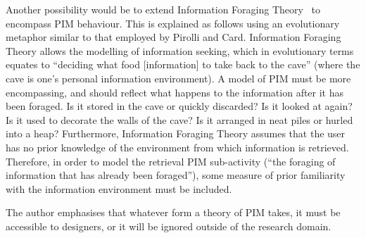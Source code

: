 Another possibility would be to extend Information Foraging Theory~\citep{pirolli:99} to encompass PIM behaviour.  This is explained as follows using an evolutionary metaphor similar to that employed by Pirolli and Card.  Information Foraging Theory allows the modelling of information seeking, which in evolutionary terms equates to ``deciding what food [information] to take back to the cave'' (where the cave is one's personal information environment).  A model of PIM must be more encompassing, and should reflect what happens to the information after it has been foraged.  Is it stored in the cave or quickly discarded?  Is it looked at again?  Is it used to decorate the walls of the cave?  Is it arranged in neat piles or hurled into a heap?  Furthermore, Information Foraging Theory assumes that the user has no prior knowledge of the environment from which information is retrieved.  Therefore, in order to model the retrieval PIM sub-activity (``the foraging of information that has already been foraged''), some measure of prior familiarity with the information environment must be included.



The author emphasises that whatever form a theory of PIM takes, it must be accessible to designers, or it will be ignored outside of the research domain.




